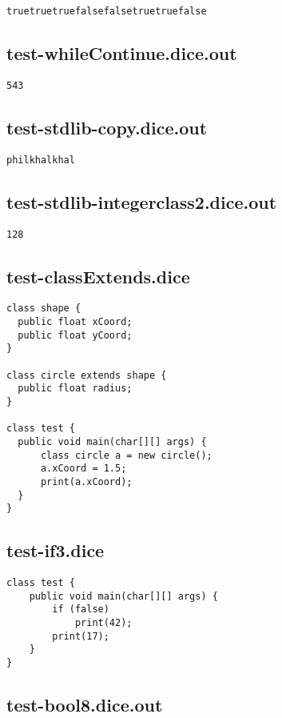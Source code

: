 \begin{verbatim}
truetruetruefalsefalsetruetruefalse

\end{verbatim}\pagebreak\subsection{test-whileContinue.dice.out}
\begin{verbatim}
543
\end{verbatim}\pagebreak\subsection{test-stdlib-copy.dice.out}
\begin{verbatim}
philkhalkhal
\end{verbatim}\pagebreak\subsection{test-stdlib-integerclass2.dice.out}
\begin{verbatim}
128

\end{verbatim}\pagebreak\subsection{test-classExtends.dice}
\begin{verbatim}
class shape {
  public float xCoord;
  public float yCoord;
}

class circle extends shape {
  public float radius;
}

class test {
  public void main(char[][] args) {
      class circle a = new circle(); 
      a.xCoord = 1.5;
      print(a.xCoord);
  }
}
\end{verbatim}\pagebreak\subsection{test-if3.dice}
\begin{verbatim}
class test {
	public void main(char[][] args) {	
  		if (false) 
  			print(42);
  		print(17);
	}
}

\end{verbatim}\pagebreak\subsection{test-bool8.dice.out}
